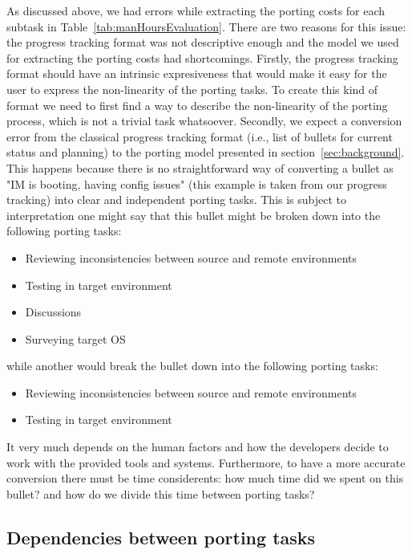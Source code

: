 As discussed above, we had errors while extracting the porting costs for each
subtask in Table~\ref{tab:manHoursEvaluation}. There are two reasons for this
issue: the progress tracking format was not descriptive enough and the model we
used for extracting the porting costs had shortcomings. Firstly, the progress
tracking format should have an intrinsic expresiveness that would make it easy
for the user to express the non-linearity of the porting tasks. To create this
kind of format we need to first find a way to describe the non-linearity of
the porting process, which is not a trivial task whatsoever.  Secondly, we
expect a conversion error from the classical progress tracking format (i.e.,
list of bullets for current status and planning) to the porting model
presented in section~\ref{sec:background}. This happens because there is no
straightforward way of converting a bullet as "IM is booting, having config
issues" (this example is taken from our progress tracking) into clear and
independent porting tasks. This is subject to interpretation one might say
that this bullet might be broken down into the following porting tasks:
\begin{itemize}
        \item Reviewing inconsistencies between source and remote environments
        \item Testing in target environment
        \item Discussions
        \item Surveying target OS
\end{itemize}
while another would break the bullet down into the following porting tasks:
\begin{itemize}
        \item Reviewing inconsistencies between source and remote environments
        \item Testing in target environment
\end{itemize}
It very much depends on the human factors and how the developers decide to work
with the provided tools and systems. Furthermore, to have a more accurate
conversion there must be time considerents: how much time did we spent on this
bullet? and how do we divide this time between porting tasks?

\subsection{Dependencies between porting tasks}

